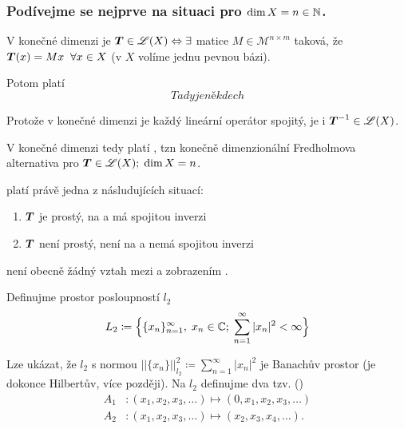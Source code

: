 \subsubsection{Podívejme se nejprve na situaci pro $\dim X=n\in \mathbb{N}$.}

V konečné dimenzi je $ \boldsymbol{T} \in \mathscr{L}(X)\Leftrightarrow \exists$ matice $M\in \mathcal{M}^{n\times m}$ taková, že $ \boldsymbol{T} (x)=Mx \;\;\forall x \in X$ (v $X$ volíme jednu pevnou bázi).

Potom platí 
$$ Tady je někde ch
$$


Protože v konečné dimenzi je každý lineární operátor spojitý, je i $ \boldsymbol{T} ^{-1}\in\mathscr{L}(X)$.

V konečné dimenzi tedy platí , tzn konečně dimenzionální Fredholmova alternativa pro $ \boldsymbol{T} \in\mathscr{L}(X);\;\dim X=n$.

platí právě jedna z násludujících situací:
\begin{enumerate}
    \item $ \boldsymbol{T} $ je prostý, na a má spojitou inverzi
    \item $ \boldsymbol{T} $ není prostý, není na a nemá spojitou inverzi
\end{enumerate}
 není obecně žádný vztah mezi  a zobrazením .

\Priklad

Definujme prostor posloupností $l_2$
$$L_2\coloneqq \Big\{ \{x_n\}_{n=1}^\infty,\; x_n\in\mathbb{C};\;\sum\limits_{n=1}^\infty|x_n|^2<\infty\Big\}$$

Lze ukázat, že $l_2$ s normou $||\{x_n\}||^2_{l_2}\coloneqq \sum_{n=1}^\infty|x_n|^2$ je Banachův prostor (je dokonce Hilbertův, více později). Na $l_2$ definujme dva tzv.  ()
\begin{equation*}
\begin{split}
  A_1&: (x_1,x_2,x_3,\dots)\mapsto (0,x_1,x_2,x_3,\dots)\\
  A_2&: (x_1,x_2,x_3,\dots)\mapsto (x_2,x_3,x_4,\dots).
\end{split}
\end{equation*}

